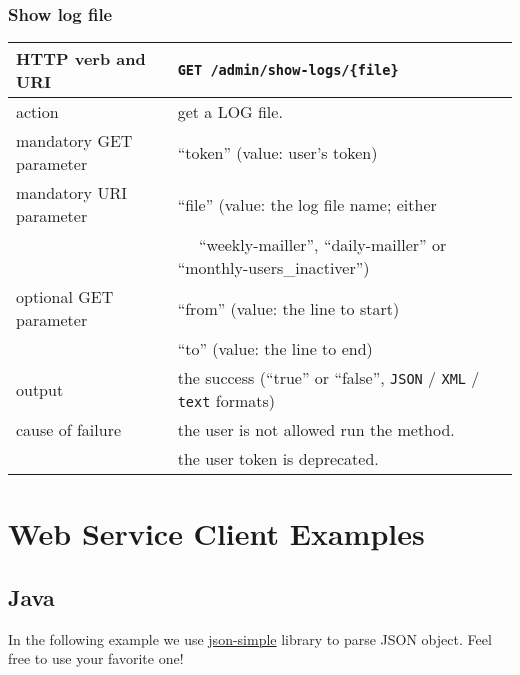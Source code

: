 \subsubsection{Show log file}
\begin{tabular}{ | l | l | }
	\hline
	HTTP verb and URI & \texttt{GET /admin/show-logs/\{file\}} \\
	\hline
	action & get a LOG file. \\
	\hline
	mandatory GET parameter & ``token'' (value: user's token) \\
	\hline
	mandatory URI parameter & ``file'' (value: the log file name; either \\
	\space & ~~ ``weekly-mailler'', ``daily-mailler'' or ``monthly-users\_inactiver'') \\
	\hline
	optional GET parameter & ``from'' (value: the line to start) \\
	\space & ``to'' (value: the line to end) \\
	\hline
	output & the success (``true'' or ``false'', \texttt{JSON} / \texttt{XML} / \texttt{text} formats) \\
	\hline
	cause of failure & the user is not allowed run the method. \\
	\space & the user token is deprecated. \\
	\hline
\end{tabular}
\newline

\section{Web Service Client Examples}

\subsection{Java}
\hspace*{\parindent}
In the following example we use \href{https://code.google.com/p/json-simple/}{json-simple} library to parse JSON object. 
Feel free to use your favorite one!

